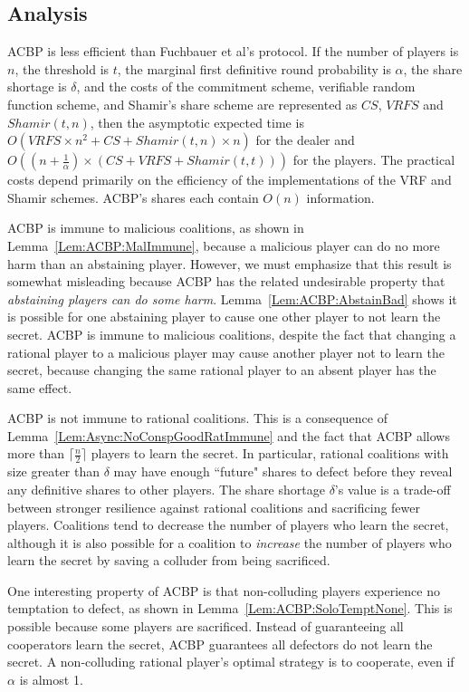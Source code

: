 \documentclass[12pt]{article}
\begin{document}
\subsection{Analysis}

ACBP is less efficient than Fuchbauer et al's protocol. If the number of players is $n$, the threshold is $t$, the marginal first definitive round probability is $\alpha$, the share shortage is $\delta$, and the costs of the commitment scheme, verifiable random function scheme, and Shamir's share scheme are represented as $CS$, $VRFS$ and $Shamir(t, n)$, then the asymptotic expected time is $O(VRFS  \times n^2 + CS + Shamir(t, n) \times n)$ for the dealer and $O((n + \frac{1}{\alpha}) \times (CS + VRFS + Shamir(t, t)))$ for the players. The practical costs depend primarily on the efficiency of the implementations of the VRF and Shamir schemes. ACBP's shares each contain $O(n)$ information.

ACBP is immune to malicious coalitions, as shown in Lemma~\ref{Lem:ACBP:MalImmune}, because a malicious player can do no more harm than an abstaining player. However, we must emphasize that this result is somewhat misleading because ACBP has the related undesirable property that \emph{abstaining players can do some harm}. Lemma~\ref{Lem:ACBP:AbstainBad} shows it is possible for one abstaining player to cause one other player to not learn the secret. ACBP is immune to malicious coalitions, despite the fact that changing a rational player to a malicious player may cause another player not to learn the secret, because changing the same rational player to an absent player has the same effect.

ACBP is not immune to rational coalitions. This is a consequence of Lemma~\ref{Lem:Async:NoConspGoodRatImmune} and the fact that ACBP allows more than $\lceil \frac{n}{2} \rceil$ players to learn the secret. In particular, rational coalitions with size greater than $\delta$ may have enough ``future" shares to defect before they reveal any definitive shares to other players. The share shortage $\delta$'s value is a trade-off between stronger resilience against rational coalitions and sacrificing fewer players. Coalitions tend to decrease the number of players who learn the secret, although it is also possible for a coalition to \emph{increase} the number of players who learn the secret by saving a colluder from being sacrificed.

One interesting property of ACBP is that non-colluding players experience no temptation to defect, as shown in Lemma~\ref{Lem:ACBP:SoloTemptNone}. This is possible because some players are sacrificed. Instead of guaranteeing all cooperators learn the secret, ACBP guarantees all defectors do not learn the secret. A non-colluding rational player's optimal strategy is to cooperate, even if $\alpha$ is almost 1.
\end{document}
